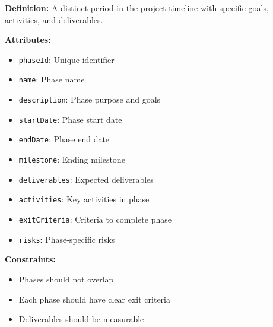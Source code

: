 \documentclass[11pt,letterpaper]{article}
\begin{document}
\begin{definitionbox}
\textbf{Definition:} A distinct period in the project timeline with specific goals, activities, and deliverables.

\textbf{Attributes:}
\begin{itemize}[nosep]
    \item \texttt{phaseId}: Unique identifier
    \item \texttt{name}: Phase name
    \item \texttt{description}: Phase purpose and goals
    \item \texttt{startDate}: Phase start date
    \item \texttt{endDate}: Phase end date
    \item \texttt{milestone}: Ending milestone
    \item \texttt{deliverables}: Expected deliverables
    \item \texttt{activities}: Key activities in phase
    \item \texttt{exitCriteria}: Criteria to complete phase
    \item \texttt{risks}: Phase-specific risks
\end{itemize}

\textbf{Constraints:}
\begin{itemize}[nosep]
    \item Phases should not overlap
    \item Each phase should have clear exit criteria
    \item Deliverables should be measurable
\end{itemize}
\end{definitionbox}
\end{document}
